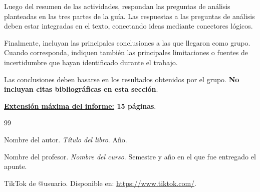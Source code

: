 \documentclass[12pt,a4paper]{article}
\begin{document}
Luego del resumen de las actividades, respondan las preguntas de análisis planteadas en las tres partes de la guía. Las respuestas a las preguntas de análisis deben estar integradas en el texto, conectando ideas mediante conectores lógicos.

Finalmente, incluyan las principales conclusiones a las que llegaron como grupo. Cuando corresponda, indiquen también las principales limitaciones o fuentes de incertidumbre que hayan identificado durante el trabajo.

Las conclusiones deben basarse en los resultados obtenidos por el grupo. \textbf{No incluyan citas bibliográficas en esta sección}.

\textbf{\underline{Extensión máxima del informe:} 15 páginas}.

\begin{thebibliography}{99}

 Nombre del autor. \textit{Título del libro}. Año.

 Nombre del profesor. \textit{Nombre del curso}. Semestre y año en el que fue entregado el apunte.

 TikTok de @usuario. Disponible en: \url{https://www.tiktok.com/}.

\end{thebibliography}
\end{document}
